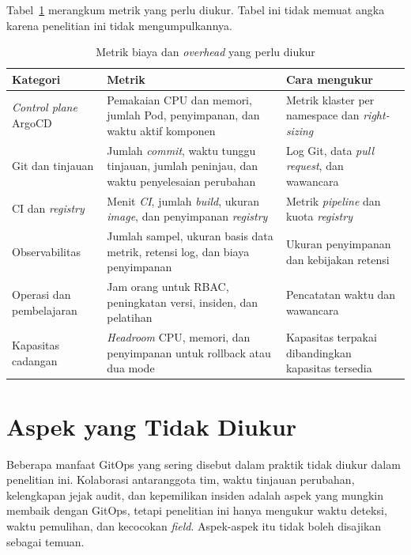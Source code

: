 Tabel~\ref{tab:biaya-metrik} merangkum metrik yang perlu diukur. Tabel ini tidak memuat angka karena penelitian ini tidak mengumpulkannya.

\begin{table}[H]
  \centering
  \small
  \caption{Metrik biaya dan \textit{overhead} yang perlu diukur}
  \label{tab:biaya-metrik}
  \begin{tabularx}{\textwidth}{|>{\raggedright\arraybackslash}p{3.2cm}|>{\raggedright\arraybackslash}X|>{\raggedright\arraybackslash}p{3.5cm}|}
    \hline
    Kategori & Metrik & Cara mengukur \\
    \hline
    \textit{Control plane} ArgoCD & Pemakaian CPU dan memori, jumlah Pod, penyimpanan, dan waktu aktif komponen & Metrik klaster per namespace dan \textit{right-sizing} \\
    \hline
    Git dan tinjauan & Jumlah \textit{commit}, waktu tunggu tinjauan, jumlah peninjau, dan waktu penyelesaian perubahan & Log Git, data \textit{pull request}, dan wawancara \\
    \hline
    CI dan \textit{registry} & Menit \textit{CI}, jumlah \textit{build}, ukuran \textit{image}, dan penyimpanan \textit{registry} & Metrik \textit{pipeline} dan kuota \textit{registry} \\
    \hline
    Observabilitas & Jumlah sampel, ukuran basis data metrik, retensi log, dan biaya penyimpanan & Ukuran penyimpanan dan kebijakan retensi \\
    \hline
    Operasi dan pembelajaran & Jam orang untuk RBAC, peningkatan versi, insiden, dan pelatihan & Pencatatan waktu dan wawancara \\
    \hline
    Kapasitas cadangan & \textit{Headroom} CPU, memori, dan penyimpanan untuk rollback atau dua mode & Kapasitas terpakai dibandingkan kapasitas tersedia \\
    \hline
  \end{tabularx}
\end{table}

\section{Aspek yang Tidak Diukur}
\label{sec:aspek-tidak-diukur}

Beberapa manfaat GitOps yang sering disebut dalam praktik tidak diukur dalam penelitian ini. Kolaborasi antaranggota tim, waktu tinjauan perubahan, kelengkapan jejak audit, dan kepemilikan insiden adalah aspek yang mungkin membaik dengan GitOps, tetapi penelitian ini hanya mengukur waktu deteksi, waktu pemulihan, dan kecocokan \textit{field}. Aspek-aspek itu tidak boleh disajikan sebagai temuan.

